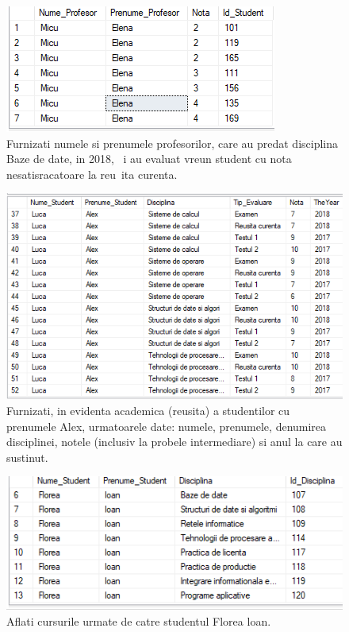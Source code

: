 \documentclass[12pt]{article}
\begin{document}
        \begin{figure}[H]
                \centering
                \includegraphics[width=.65\textwidth]{img11.png}
                \caption{Furnizati numele si prenumele profesorilor, care au predat disciplina Baze de date, in 2018, ~i au evaluat vreun student cu nota nesatisracatoare la reu~ita curenta.  }
        \end{figure}
        \vspace{0.5 cm}

        \begin{figure}[H]
                \centering
                \includegraphics[width=.95\textwidth]{img12.png}
                \caption{Furnizati, in evidenta academica (reusita) a studentilor cu prenumele Alex, urmatoarele date: numele, prenumele, denumirea disciplinei, notele (inclusiv la probele intermediare) si anul la care au sustinut. }
        \end{figure}
        \vspace{0.5 cm}

        \begin{figure}[H]
                \centering
                \includegraphics[width=.85\textwidth]{img13.png}
                \caption{Aflati cursurile urmate de catre studentul Florea loan.}
        \end{figure}
        \vspace{0.5 cm}
\end{document}
